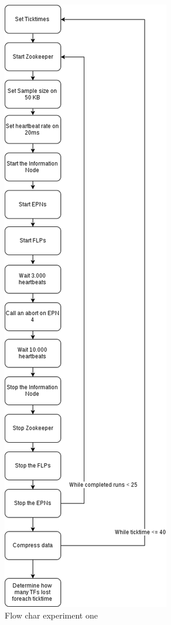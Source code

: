 \begin{figure}
    \centering
    \includegraphics[scale=0.3]{./graphics/ex1.png}
    \caption{Flow char experiment one}
    \label{fig:FlowChart1}
\end{figure}

